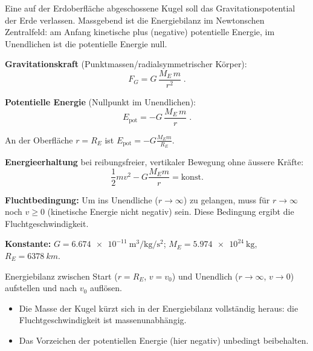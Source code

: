 
Eine auf der Erdoberfläche abgeschossene Kugel soll das Gravitationspotential
der Erde verlassen. Massgebend ist die Energiebilanz im Newtonschen
Zentralfeld: am Anfang kinetische plus (negative) potentielle Energie, im
Unendlichen ist die potentielle Energie null.

\begin{werkzeugkasten}[Werkzeuge]
\textbf{Gravitationskraft} (Punktmassen/radialsymmetrischer Körper):
\begin{equation}
  F_G = G\,\frac{M_E\, m}{r^2}\;.
\end{equation}

\textbf{Potentielle Energie} (Nullpunkt im Unendlichen):
\begin{equation}
  E_\mathrm{pot} = -G\,\frac{M_E\, m}{r}\;.
\end{equation}

An der Oberfläche $r=R_E$ ist $E_\mathrm{pot}=-G\frac{M_E m}{R_E}$.

\textbf{Energieerhaltung} bei reibungsfreier, vertikaler Bewegung ohne äussere
Kräfte:
\begin{equation}
  \frac12 m v^2 - G\frac{M_E m}{r} = \mathrm{konst}.
\end{equation}

\textbf{Fluchtbedingung:} Um ins Unendliche ($r\to\infty$) zu gelangen, muss
für $r\to\infty$ noch $v\ge 0$ (kinetische Energie nicht negativ) sein.
Diese Bedingung ergibt die Fluchtgeschwindigkeit.

\textbf{Konstante:} $G=\qty{6.674e-11}{\metre\cubed\per\kilogram
\per\square\second}$; $M_E=\qty{5.974e24}{\kg}$, $R_E=\qty{6378}{km}$.
\end{werkzeugkasten}

\begin{werkzeugkasten}
Energiebilanz zwischen Start ($r=R_E$, $v=v_0$) und Unendlich
($r\to\infty$, $v\to 0$)
aufstellen und nach $v_0$ auflösen.
\end{werkzeugkasten}

\begin{achtung}
\begin{itemize}
  \item Die Masse der Kugel kürzt sich in der Energiebilanz vollständig
       heraus: die Fluchtgeschwindigkeit ist massenunabhängig.
  \item Das Vorzeichen der potentiellen Energie (hier negativ) unbedingt
       beibehalten.
\end{itemize}
\end{achtung}
